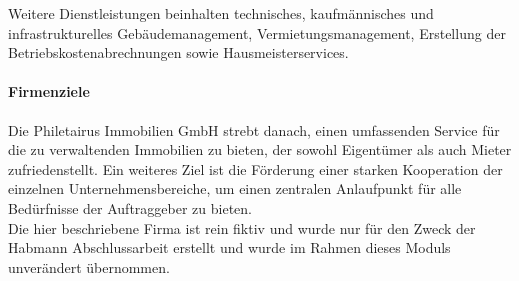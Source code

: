 Weitere Dienstleistungen beinhalten technisches, kaufmännisches und infrastrukturelles Gebäudemanagement, Vermietungsmanagement, Erstellung der Betriebskostenabrechnungen sowie Hausmeisterservices.\\

\paragraph{Firmenziele}

Die Philetairus Immobilien GmbH strebt danach, einen umfassenden Service für die zu verwaltenden Immobilien zu bieten, der sowohl Eigentümer als auch Mieter zufriedenstellt. Ein weiteres Ziel ist die Förderung einer starken Kooperation der einzelnen Unternehmensbereiche, um einen zentralen Anlaufpunkt für alle Bedürfnisse der Auftraggeber zu bieten.\\

Die hier beschriebene Firma ist rein fiktiv und wurde nur für den Zweck der Habmann Abschlussarbeit erstellt und wurde im Rahmen dieses Moduls unverändert übernommen. \\
\newpage
